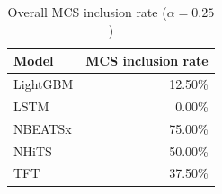 \begin{table}
\caption{Overall MCS inclusion rate ($\alpha=0.25$)}
\begin{tabular}{lr}
\toprule
Model & MCS inclusion rate \\
\midrule
LightGBM & 12.50\% \\
LSTM & 0.00\% \\
NBEATSx & 75.00\% \\
NHiTS & 50.00\% \\
TFT & 37.50\% \\
\bottomrule
\end{tabular}
\end{table}
